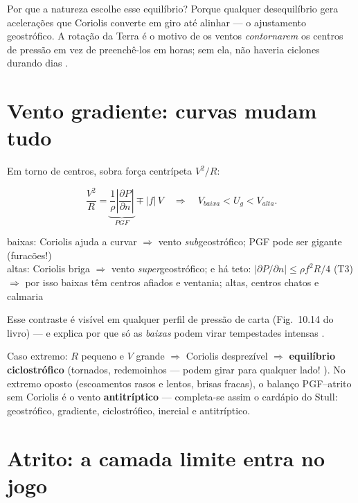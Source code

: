 \documentclass[11pt]{article}
\begin{document}
Por que a natureza escolhe esse equilíbrio? Porque qualquer
desequilíbrio gera acelerações que Coriolis converte em giro até
alinhar — o ajustamento geostrófico. A rotação da Terra é o motivo de os
ventos \emph{contornarem} os centros de pressão em vez de preenchê-los
em horas; sem ela, não haveria ciclones durando dias
.

\section{Vento gradiente: curvas mudam tudo}\label{sec:gradiente}


Em torno de centros, sobra força centrípeta $V^2/R$:

\begin{formalivro}
\[ \frac{V^2}{R} =
\underbrace{\frac{1}{\rho}\left|\frac{\partial P}{\partial n}\right|}_{PGF}
 \mp |f|\,V
\quad\Rightarrow\quad
V_{baixa} < U_g < V_{alta}. \]
\end{formalivro}

\begin{noquadro}
baixas: Coriolis ajuda a curvar $\Rightarrow$ vento
\emph{sub}geostrófico; PGF pode ser gigante (furacões!)\\
altas: Coriolis briga $\Rightarrow$ vento \emph{super}geostrófico; e há
teto: $|\partial P/\partial n| \le \rho f^2R/4$ (T3)\\[2pt]
$\Rightarrow$ por isso baixas têm centros afiados e ventania; altas,
centros chatos e calmaria
\end{noquadro}

Esse contraste é visível em qualquer perfil de pressão de carta
(Fig.~10.14 do livro) — e explica por que só as \emph{baixas} podem
virar tempestades intensas .

Caso extremo: $R$ pequeno e $V$ grande $\Rightarrow$ Coriolis
desprezível $\Rightarrow$ \textbf{equilíbrio ciclostrófico} (tornados,
redemoinhos — podem girar para qualquer lado!
). No extremo oposto (escoamentos rasos e
lentos, brisas fracas), o balanço PGF--atrito sem Coriolis é o vento
\textbf{antitríptico} — completa-se assim o cardápio do Stull:
geostrófico, gradiente, ciclostrófico, inercial e antitríptico.

\section{Atrito: a camada limite entra no jogo}\label{sec:atrito}
\end{document}
